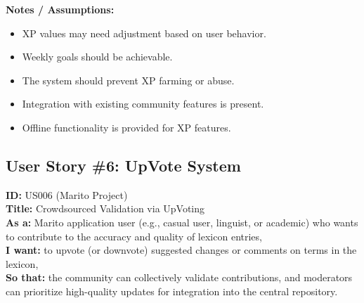 \documentclass[12pt]{article}
\begin{document}
\vspace{1em}
\textbf{Notes / Assumptions:}
\begin{itemize}
    \item XP values may need adjustment based on user behavior.
    \item Weekly goals should be achievable.
    \item The system should prevent XP farming or abuse.
    \item Integration with existing community features is present.
    \item Offline functionality is provided for XP features.
\end{itemize}


\subsection{User Story \#6: UpVote System}

\textbf{ID:} US006 (Marito Project) \\
\textbf{Title:} Crowdsourced Validation via UpVoting \\
\textbf{As a:} Marito application user (e.g., casual user, linguist, or academic) who wants to contribute to the accuracy and quality of lexicon entries, \\
\textbf{I want:} to upvote (or downvote) suggested changes or comments on terms in the lexicon, \\
\textbf{So that:} the community can collectively validate contributions, and moderators can prioritize high-quality updates for integration into the central repository.
\end{document}
